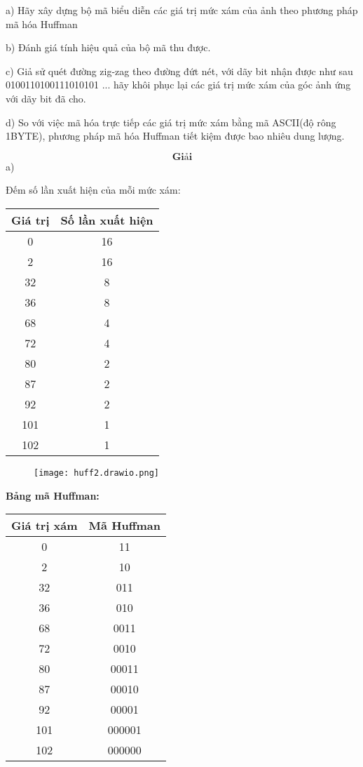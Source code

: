 \documentclass[12pt]{article}
\begin{document}
a) Hãy xây dựng bộ mã biểu diễn các giá trị mức xám của ảnh theo phương pháp mã hóa Huffman

b) Đánh giá tính hiệu quả của bộ mã thu được.

c) Giả sử quét đường zig-zag theo đường đứt nét, với dãy bit nhận được như sau 0100110100111010101 ... hãy khôi phục lại các giá trị mức xám của góc ảnh ứng với dãy bit đã cho.

d) So với việc mã hóa trực tiếp các giá trị mức xám bằng mã ASCII(độ rông 1BYTE), phương pháp mã hóa Huffman tiết kiệm được bao nhiêu dung lượng.

\[
\textbf{Giải}
\]
a)

Đếm số lần xuất hiện của mỗi mức xám:

\begin{center}
\begin{tabular}{|c|c|}
\hline
\textbf{Giá trị} & \textbf{Số lần xuất hiện} \\
\hline
0 & 16 \\
2 & 16 \\
32 & 8 \\
36 & 8 \\
68 & 4 \\
72 & 4 \\
80 & 2 \\
87 & 2 \\
92 & 2 \\
101 & 1 \\
102 & 1 \\
\hline
\end{tabular}
\end{center}
\begin{figure}[h]
    \centering
    \texttt{[image: huff2.drawio.png]}
    \caption{}
    \label{fig:enter-label}
\end{figure}

\begin{center}
\textbf{Bảng mã Huffman:}

\vspace{0.3cm}
\begin{tabular}{|c|c|}
\hline
\textbf{Giá trị xám} & \textbf{Mã Huffman} \\
\hline
0   & 11 \\
2   & 10 \\
32  & 011 \\
36  & 010 \\
68  & 0011 \\
72  & 0010 \\
80  & 00011 \\
87  & 00010 \\
92  & 00001 \\
101 & 000001 \\
102 & 000000 \\
\hline
\end{tabular}
\end{center}
\end{document}
